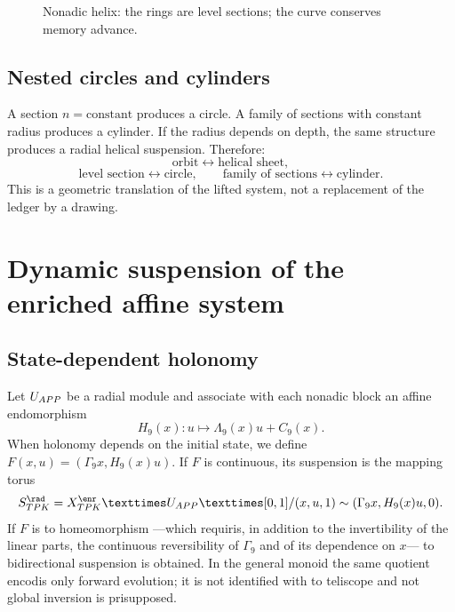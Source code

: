 \begin{figure}[htbp]
\centering
{}
\caption{Nonadic helix: the rings are level sections; the curve conserves memory advance.}
\label{espiral:fig:helice-nonadica-analitica}
\end{figure}

\section{Nested circles and cylinders}

A section \(n=\text{constant}\) produces a circle. A family of sections with constant radius produces a cylinder. If the radius depends on depth, the same structure produces a radial helical suspension. Therefore:
\[
 \text{orbit}\longleftrightarrow\text{helical sheet},
\]
\[
 \text{level section}\longleftrightarrow\text{circle},
\qquad
 \text{family of sections}\longleftrightarrow\text{cylinder}.
\]
This is a geometric translation of the lifted system, not a replacement
of the ledger by a drawing.

\chapter{Dynamic suspension of the enriched affine system}

\section{State-dependent holonomy}

Let \(U_{APP}\) be a radial module and associate with each nonadic block an
affine endomorphism
\[
 H_9(x):u\longmapsto\Lambda_9(x)u+C_9(x).
\]
When holonomy depends on the initial state, we define
\(F(x,u)=(\Gamma_9x,H_9(x)u)\). If \(F\) is continuous, its suspension is
the mapping torus
\begin{equation}
 \mathfrak S_{\TPK}^{\rad}
 =\frac{X_{\TPK}^{\enr}\times U_{\APP}\times[0,1]}
 {(x,u,1)\sim(\Gamma_9x,H_9(x)u,0)}.
 \label{espiral:eq:suspension-skew}
\end{equation}
If \(F\) is to homeomorphism ---which requiris, in addition to the invertibility
of the linear parts, the continuous reversibility of \(\Gamma_9\) and of its
dependence on \(x\)--- to bidirectional suspension is obtained. In the
general monoid the same quotient encodis only forward evolution;
it is not identified with to teliscope and not global inversion is prisupposed.

